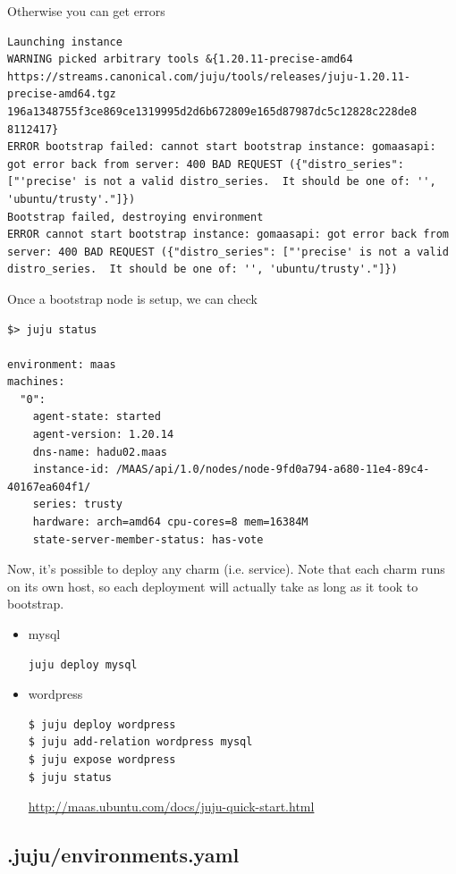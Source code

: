 Otherwise you can get errors
\begin{verbatim}
Launching instance
WARNING picked arbitrary tools &{1.20.11-precise-amd64 https://streams.canonical.com/juju/tools/releases/juju-1.20.11-precise-amd64.tgz 196a1348755f3ce869ce1319995d2d6b672809e165d87987dc5c12828c228de8 8112417}
ERROR bootstrap failed: cannot start bootstrap instance: gomaasapi: got error back from server: 400 BAD REQUEST ({"distro_series": ["'precise' is not a valid distro_series.  It should be one of: '', 'ubuntu/trusty'."]})
Bootstrap failed, destroying environment
ERROR cannot start bootstrap instance: gomaasapi: got error back from server: 400 BAD REQUEST ({"distro_series": ["'precise' is not a valid distro_series.  It should be one of: '', 'ubuntu/trusty'."]})

\end{verbatim}

Once a bootstrap node is setup, we can check
\begin{verbatim}
$> juju status

environment: maas
machines:
  "0":
    agent-state: started
    agent-version: 1.20.14
    dns-name: hadu02.maas
    instance-id: /MAAS/api/1.0/nodes/node-9fd0a794-a680-11e4-89c4-40167ea604f1/
    series: trusty
    hardware: arch=amd64 cpu-cores=8 mem=16384M
    state-server-member-status: has-vote
\end{verbatim}

Now, it's possible to deploy any charm (i.e. service).
Note that each charm runs on its own host, so each deployment will actually take
as long as it took to bootstrap.
\begin{itemize}
  \item mysql
  
\begin{verbatim}
juju deploy mysql
\end{verbatim}

  \item wordpress
\begin{verbatim}
$ juju deploy wordpress
$ juju add-relation wordpress mysql
$ juju expose wordpress
$ juju status
\end{verbatim}
\url{http://maas.ubuntu.com/docs/juju-quick-start.html}

\end{itemize}


\subsection{.juju/environments.yaml}
\label{sec:juju/environments.yaml}

